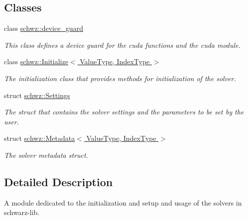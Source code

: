 \subsection*{Classes}
\begin{DoxyCompactItemize}
\item 
class \hyperlink{classschwz_1_1device__guard}{schwz\+::device\+\_\+guard}
\begin{DoxyCompactList}\small\item\em This class defines a device guard for the cuda functions and the cuda module. \end{DoxyCompactList}\item 
class \hyperlink{classschwz_1_1Initialize}{schwz\+::\+Initialize$<$ Value\+Type, Index\+Type $>$}
\begin{DoxyCompactList}\small\item\em The initialization class that provides methods for initialization of the solver. \end{DoxyCompactList}\item 
struct \hyperlink{structschwz_1_1Settings}{schwz\+::\+Settings}
\begin{DoxyCompactList}\small\item\em The struct that contains the solver settings and the parameters to be set by the user. \end{DoxyCompactList}\item 
struct \hyperlink{structschwz_1_1Metadata}{schwz\+::\+Metadata$<$ Value\+Type, Index\+Type $>$}
\begin{DoxyCompactList}\small\item\em The solver metadata struct. \end{DoxyCompactList}\end{DoxyCompactItemize}


\subsection{Detailed Description}
A module dedicated to the initialization and setup and usage of the solvers in schwarz-\/lib. 


